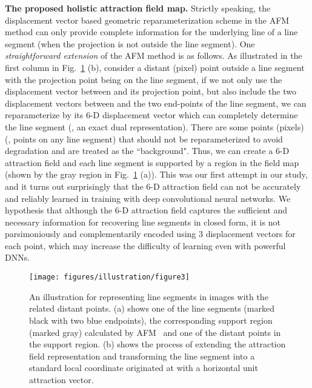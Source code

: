 \documentclass[10pt,twocolumn,letterpaper]{article}
\begin{document}
\textbf{The proposed holistic attraction field map.} Strictly speaking, the displacement vector based geometric reparameterization scheme in the AFM method can only provide complete information for the underlying line  of a line segment  (when the projection is not outside the line segment).
One \textit{straightforward extension } of the AFM method is as follows. As illustrated in the first column in Fig.~\ref{fig:HAF} (b), consider a distant (pixel) point  outside a line segment  with the projection point being on the line segment, if we not only use the displacement vector between  and its projection point, but also include the two displacement vectors between  and the two end-points of the line segment, we can reparameterize  by its 6-D displacement vector which can completely determine the line segment (\ie, an exact dual representation). There are some points (pixels) (\eg, points on any line segment) that should not be reparameterized to avoid degradation and are treated as the ``background". Thus, we can create a 6-D attraction field and each line segment is supported by a region in the field map (shown by the gray region in Fig.~\ref{fig:HAF} (a)).  This was our first attempt in our study, and it turns out surprisingly that the 6-D attraction field can not be accurately and reliably learned in training with deep convolutional neural networks. We hypothesis that although the 6-D attraction field captures the sufficient and necessary information for recovering line segments in closed form, it is not parsimoniously and complementarily encoded using 3 displacement vectors for each point, which may increase the  difficulty of learning even with powerful DNNs.         
\begin{figure}
    \centering
    \texttt{[image: figures/illustration/figure3]}
    \caption{An illustration for representing line segments in images with the related distant points. (a) shows one of the line segments (marked black with two blue endpoints), the corresponding support region (marked gray) calculated by AFM~\cite{afm} and one of the distant points in the support region. (b) shows the process of extending the attraction field representation and transforming the line segment into a standard local coordinate originated at  with a horizontal unit attraction vector. }
    \label{fig:HAF}
\end{figure}
\end{document}
